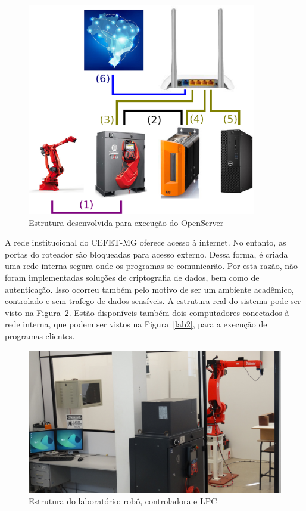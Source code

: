         \begin{figure}[ht]
            \centering
            \includegraphics[width=10cm]{imagens/Conexoes/conexoes-openserver.eps}
            \small 
            \centering 
            \caption{Estrutura desenvolvida para execução do OpenServer}
            
            \label{conexoes-openserver}
        \end{figure}
        
        A rede institucional do CEFET-MG oferece acesso à internet. No entanto, as portas do roteador são bloqueadas para acesso externo. Dessa forma, é criada uma rede interna segura onde os programas se comunicarão. Por esta razão, não foram implementadas soluções de criptografia de dados, bem como de autenticação. Isso ocorreu também pelo motivo de ser um ambiente acadêmico, controlado e sem trafego de dados sensíveis. A estrutura real do sistema pode ser visto na Figura~\ref{lab1}. Estão disponíveis também dois computadores conectados à rede interna, que podem ser vistos na Figura~\ref{lab2}, para a execução de programas clientes.
        
        \begin{figure}[ht]
            \centering
            \includegraphics[width=\columnwidth]{imagens/Fotos/estrutura-lab-1.JPG}
            \small 
            \centering 
            \caption{Estrutura do laboratório: robô, controladora e \ac{LPC}}
            \label{lab1}
        \end{figure}
        
